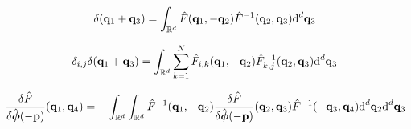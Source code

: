 \documentclass[10pt]{article}
\begin{document}
\begin{equation}
   \delta({\bf q}_1 +{\bf q}_3) = \int_{\mathbb{R}^d} \hat{F}({\bf q}_1, -{\bf q}_2) \hat{F}^{-1}({\bf q}_2, {\bf q}_3) \text{d}^d {\bf q}_3
\end{equation}


\begin{equation}
   \delta_{i,j}\delta({\bf q}_1 +{\bf q}_3) = \int_{\mathbb{R}^d} \sum_{k=1}^{N} \hat{F}_{i,k}({\bf q}_1, -{\bf q}_2) \hat{F}^{-1}_{k,j}({\bf q}_2, {\bf q}_3) \text{d}^d {\bf q}_3
\end{equation}

\begin{equation}
   \frac{\delta \hat{F}}{\delta \hat{\boldsymbol{ \phi}}(-{\bf p})}({\bf q}_1, {\bf q}_4) = - \int_{\mathbb{R}^d} \int_{\mathbb{R}^d} \hat{F}^{-1}({\bf q}_1, -{\bf q}_2) \frac{\delta \hat{F}}{\delta \hat{\boldsymbol{ \phi}}(-{\bf p})}({\bf q}_2, {\bf q}_3) \hat{F}^{-1}(-{\bf q}_3, {\bf q}_4) \text{d}^d {\bf q}_2 \text{d}^d {\bf q}_3
\end{equation}










\pagebreak
\end{document}
